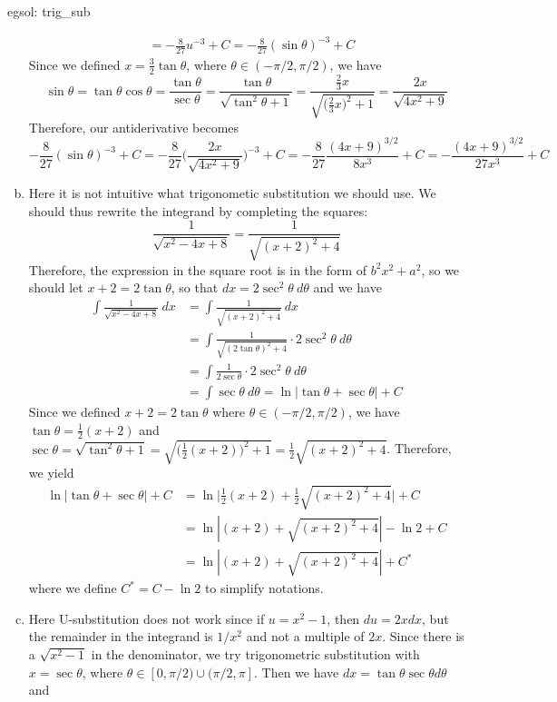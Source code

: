 \begin{egsol}[]{egsol: trig_sub}
\begin{enumerate}[a)]
\begin{align*}
                &=-\frac{8}{27}u^{-3} + C = -\frac{8}{27}(\sin\theta)^{-3} + C
            \end{align*}
            Since we defined $x = \frac{3}{2}\tan \theta$, where $\theta \in (-\pi/2, \pi/2)$, we have
            \[\sin\theta = \tan\theta \cos\theta = \frac{\tan\theta}{\sec\theta} = \frac{\tan\theta}{\sqrt{\tan^2\theta + 1}} = \frac{\frac{2}{3}x}{\sqrt{\big(\frac{2}{3}x\big)^2+1}}=\frac{2x}{\sqrt{4x^2+9}}\]
            Therefore, our antiderivative becomes
            \[-\frac{8}{27}(\sin\theta)^{-3} + C = -\frac{8}{27}\Big(\frac{2x}{\sqrt{4x^2+9}}\Big)^{-3} + C = -\frac{8}{27}\frac{(4x+9)^{3/2}}{8x^3} + C = -\frac{(4x+9)^{3/2}}{27x^3} + C\]
            \item Here it is not intuitive what trigonometic substitution we should use.  We should thus rewrite the integrand by completing the squares:
            \[\frac{1}{\sqrt{x^2-4x+8}} = \frac{1}{\sqrt{(x+2)^2+4}}\]
            Therefore, the expression in the square root is in the form of $b^2x^2+a^2$, so we should let $x+2 = 2\tan\theta$, so that $dx = 2\sec^2\theta~d\theta$ and we have
            \begin{align*}
                \int \frac{1}{\sqrt{x^2-4x+8}}~dx &= \int \frac{1}{\sqrt{(x+2)^2+4}}~dx\\
                &=\int \frac{1}{\sqrt{(2\tan\theta)^2+4}}\cdot 2\sec^2\theta~d\theta\\
                &=\int \frac{1}{2\sec\theta}\cdot 2\sec^2\theta~d\theta\\
                &=\int \sec\theta~d\theta = \ln|\tan \theta + \sec \theta| + C
            \end{align*}
            Since we defined $x+2 = 2\tan\theta$ where $\theta \in (-\pi/2, \pi/2)$, we have $\tan\theta = \frac{1}{2}(x+2)$ and $\sec\theta = \sqrt{\tan^2\theta + 1} = \sqrt{\big(\frac{1}{2}(x+2)\big)^2+1} = \frac{1}{2}\sqrt{(x+2)^2+4}$.  Therefore, we yield
            \begin{align*}
                \ln|\tan \theta + \sec \theta| + C &= \ln\Big|\frac{1}{2}(x+2) + \frac{1}{2}\sqrt{(x+2)^2+4}\Big| + C\\
                &= \ln|(x+2) + \sqrt{(x+2)^2+4}| - \ln 2 + C\\
                &= \ln|(x+2) + \sqrt{(x+2)^2+4}|+C^*
            \end{align*}
            where we define $C^* = C - \ln 2$ to simplify notations.
            \item Here U-substitution does not work since if $u = x^2-1$, then $du = 2xdx$, but the remainder in the integrand is $1/x^2$ and not a multiple of $2x$.  Since there is a $\sqrt{x^2 - 1}$ in the denominator, we try trigonometric substitution with $x = \sec \theta$, where $\theta \in [0,\pi/2)\cup(\pi/2,\pi]$.  Then we have $dx = \tan\theta\sec\theta d\theta$ and 

\end{enumerate}
\end{egsol}
